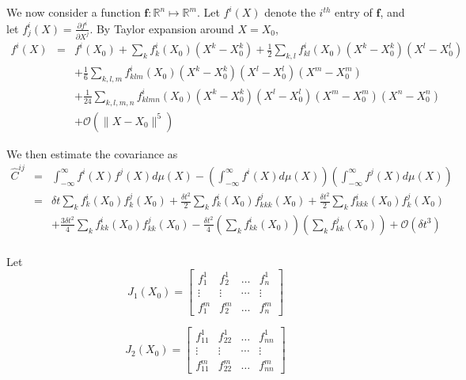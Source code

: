 \documentclass[12pt]{article}
\begin{document}
We now consider a function $\mathbf{f}: \mathbb{R}^n \mapsto \mathbb{R}^m$.
%
Let $f^i(X)$ denote the $i^{th}$ entry of $\mathbf{f}$, and let $f^i_j(X) = \frac{\partial f^i}{\partial X^j}$.
%
By Taylor expansion around $X=X_0$,
\begin{eqnarray}
f^i(X) &=& 
f^i(X_0) 
+ \sum_k f^i_k(X_0)  (X^k-X^k_0) 
+\frac{1}{2} \sum_{k,l}  f^i_{kl} (X_0) (X^k-X_0^k) (X^l-X_0^l) \\
&& + \frac{1}{6} \sum_{k,l,m} f^i_{klm} (X_0) (X^k-X_0^k) (X^l-X_0^l) (X^m-X_0^m) \\
&& + \frac{1}{24} \sum_{k,l,m,n} f^i_{klmn} (X_0) (X^k-X_0^k) (X^l-X_0^l) (X^m-X_0^m) (X^n-X_0^n) \\
&&+ \mathcal{O}\left( \| X- X_0 \|^5 \right)
\end{eqnarray}



We then estimate the covariance as
\begin{eqnarray}
\hat{C}^{ij} &=& 
\int_{-\infty}^{\infty} f^i(X) f^j(X) d\mu(X) - \left(\int_{-\infty}^{\infty} f^i(X) d\mu(X) \right) \left(\int_{-\infty}^{\infty} f^j(X) d\mu(X) \right) \\
&=&
\delta t \sum_k f^i_k(X_0)  f^j_k(X_0) 
+ \frac{\delta t^2}{2} \sum_k f^i_k(X_0) f^j_{kkk} (X_0)  
 + \frac{\delta t^2}{2} \sum_k f^i_{kkk} (X_0) f^j_k(X_0) \\
&&+  \frac{3 \delta t^2}{4} \sum_{k} f^i_{kk}(X_0) f^j_{kk}(X_0) 
- \frac{\delta t^2}{4} \left( \sum_k f^i_{kk}(X_0) \right) \left( \sum_k f^j_{kk}(X_0) \right) 
 + \mathcal{O}\left( \delta t^3 \right) \\
\end{eqnarray}

Let 
\begin{equation}
J_1(X_0) = \begin{bmatrix}
f_1^1 & f_2^1 & \dots & f_n^1 \\
\vdots & \vdots & \cdots & \vdots \\
f_1^m & f_2^m & \dots & f_n^m
\end{bmatrix}
\end{equation}

\begin{equation}
J_2(X_0) = \begin{bmatrix}
f_{11}^1 & f_{22}^1 & \dots & f_{nn}^1 \\
\vdots & \vdots & \cdots & \vdots \\
f_{11}^m & f_{22}^m & \dots & f_{nn}^m
\end{bmatrix}
\end{equation}
\end{document}
